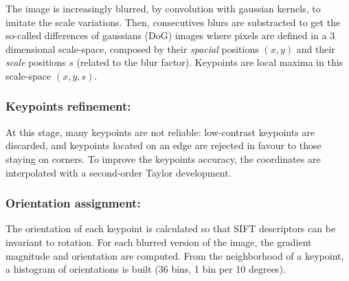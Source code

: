 \documentclass[preprint]{iucr}
\begin{document}
The image is increasingly blurred, by convolution with gaussian kernels, to
imitate the scale variations.
Then, consecutives blurs are substracted to get the so-called differences of
gaussians (DoG) images where pixels are defined in a 3 dimensional
scale-space, composed by  their \emph{spacial} positions $(x, y)$ and their
\emph{scale} positions $s$ (related to the blur factor). Keypoints are
local maxima in this scale-space $(x, y, s)$.



\subsubsection{Keypoints refinement:}

At this stage, many keypoints are not reliable: low-contrast keypoints are
discarded, and keypoints located on an edge are rejected in favour to those
staying on corners.
To improve the keypoints accuracy, the coordinates are interpolated with a
second-order Taylor development.


\subsubsection{Orientation assignment:}
The orientation of each keypoint is calculated  so that SIFT descriptors
can be invariant to rotation.
For each blurred version of the image, the gradient magnitude and orientation
are computed.
From the neighborhood of a keypoint, a histogram of orientations is built (36
bins, 1 bin per 10 degrees).
\end{document}
